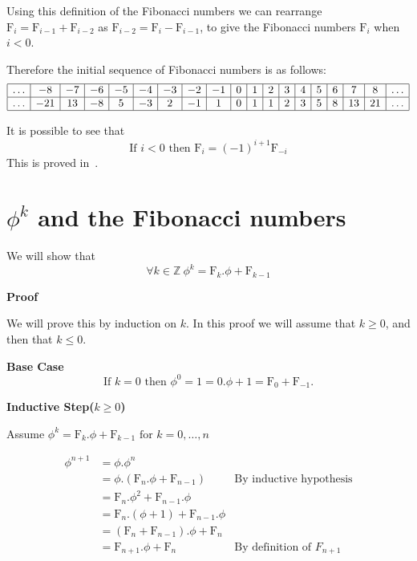 \documentclass{cs4rep}
\begin{document}
Using this definition of the Fibonacci numbers we can
rearrange $\mbox{F}_{i} = \mbox{F}_{i-1} + \mbox{F}_{i-2}$ as
$\mbox{F}_{i-2} = \mbox{F}_{i} - \mbox{F}_{i-1}$, to give the
Fibonacci numbers $\mbox{F}_{i}$ when $i<0$.

Therefore the initial sequence of Fibonacci numbers is as follows:
\[ \begin{array}{|c|c|c|c|c|c|c|c|c|c|c|c|c|c|c|c|c|c|c|}
\hline \ldots & -8 & -7 & -6 & -5 & -4 & -3 & -2 & -1 & 0 & 1 & 2 & 3 & 4  &5 & 6 & 7 & 8 & \ldots \\
\hline  \ldots & -21 & 13 & -8 & 5 & -3 & 2 & -1 & 1 & 0 & 1 & 1 & 2 & 3 & 5 & 8 & 13 & 21 & \ldots \\
\hline 
\end{array} \]

It is possible to see that
\[ \mbox{If } i<0 \mbox{ then } \mbox{F}_{i} = (-1)^{i+1} \mbox{F}_{-i} \]
This is proved in~\cite[Section 6.6, page 279]{kn:Graham}.


\section{$\phi^{k}$ and the Fibonacci numbers}

We will show that
\[ \forall k \in \mathbb{Z} \ \phi^{k} = \mbox{F}_{k}.\phi + \mbox{F}_{k-1} \]

{\bf Proof} 

We will prove this by induction on $k$. In this proof we
will assume that $k \geq 0$, and then that $k \leq 0$.

{\bf Base Case}
\[ \mbox{If } k=0 \mbox{ then } \phi^{0}=1=0.\phi+1=\mbox{F}_{0} + \mbox{F}_{-1}. \]

{\bf Inductive Step($k \geq 0$)}

Assume $\phi^{k} = \mbox{F}_{k}.\phi + \mbox{F}_{k-1} \mbox{ for }
k=0,\ldots ,n $

\[ \begin{array}{lll}
\phi^{n+1} & = \phi.\phi^{n} \\
& = \phi.(\mbox{F}_{n}.\phi + \mbox{F}_{n-1}) & \mbox{By inductive hypothesis} \\
& = \mbox{F}_{n}.\phi^{2} + \mbox{F}_{n-1}.\phi  \\
& = \mbox{F}_{n}.(\phi + 1) + \mbox{F}_{n-1}.\phi \\
& = (\mbox{F}_{n} + \mbox{F}_{n-1}).\phi + \mbox{F}_{n} \\
& = \mbox{F}_{n+1}.\phi + \mbox{F}_{n} & \mbox{By definition of } F_{n+1} 
\end{array} \]
\end{document}
